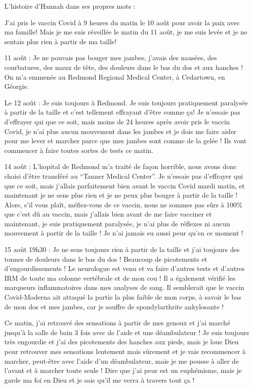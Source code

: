 L'histoire d'Hannah dans ses propres mots :

J'ai pris le vaccin Covid à 9 heures du matin le 10 août pour avoir la paix avec
ma famille! Mais je me suis réveillée le matin du 11 août, je me suis levée et
je ne sentais plus rien à partir de ma taille!

11 août : Je ne pouvais pas bouger mes jambes, j'avais des nausées, des
courbatures, des maux de tête, des douleurs dans le bas du dos et aux hanches !
On m'a emmenée au Redmond Regional Medical Center, à Cedartown, en Géorgie.

Le 12 août : Je suis toujours à Redmond. Je suis toujours pratiquement paralysée
à partir de la taille et c'est tellement effrayant d'être comme ça! Je n'essaie
pas d'effrayer qui que ce soit, mais moins de 24 heures après avoir pris le
vaccin Covid, je n'ai plus aucun mouvement dans les jambes et je dois me faire
aider pour me lever et marcher parce que mes jambes sont comme de la gelée ! Ils
vont commencer à faire toutes sortes de tests ce matin.

14 août : L'hopital de Redmond m'a traité de façon horrible, nous avons donc
choisi d'être transféré au “Tanner Medical Center”. Je n'essaie pas d'effrayer
qui que ce soit, mais j'allais parfaitement bien avant le vaccin Covid mardi
matin, et maintenant je ne sens plus rien et je ne peux plus bouger à partir de
la taille ! Alors, s'il vous plaît, méfiez-vous de ce vaccin, nous ne sommes pas
sûrs à 100\% que c'est dû au vaccin, mais j'allais bien avant de me faire
vacciner et maintenant, je suis pratiquement paralysée, je n'ai plus de réflexes
ni aucun mouvement à partir de la taille ! Je n'ai jamais eu aussi peur qu'en ce
moment !

15 août 19h30 : Je ne sens toujours rien à partir de la taille et j'ai toujours
des tonnes de douleurs dans le bas du dos ! Beaucoup de picotements et
d'engourdissements ! Le neurologue est venu et va faire d'autres tests et
d'autres IRM de toute ma colonne vertébrale et de mon cou ! Il a également
vérifié les marqueurs inflammatoires dans mes analyses de sang. Il semblerait
que le vaccin Covid-Moderna ait attaqué la partie la plus faible de mon corps, à
savoir le bas de mon dos et mes jambes, car je souffre de spondylarthrite
ankylosante !

Ce matin, j'ai retrouvé des sensations à partir de mes genoux et j'ai marché
jusqu'à la salle de bain 3 fois avec de l'aide et une déambulateur ! Je suis
toujours très engourdie et j'ai des picotements des hanches aux pieds, mais je
loue Dieu pour retrouver mes sensations lentement mais sûrement et je vais
recommencer à marcher, peut-être avec l'aide d'un déambulateur, mais je me
pousse à aller de l'avant et à marcher toute seule ! Dire que j'ai peur est un
euphémisme, mais je garde ma foi en Dieu et je sais qu'il me verra à travers
tout ça !

